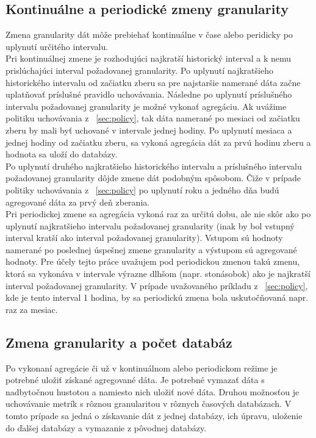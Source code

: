 \documentclass[12pt,twoside,color,cover,table]{fithesis3}
\begin{document}
\subsection{Kontinuálne a periodické zmeny granularity}
Zmena granularity dát môže prebiehať kontinuálne v čase alebo peridicky po uplynutí určitého intervalu. 
\\Pri kontinuálnej zmene je rozhodujúci najkratší historický interval a k nemu prislúchajúci interval požadovanej granularity. Po uplynutí najkratšieho historického intervalu od začiatku zberu sa pre 
najstaršie namerané dáta začne uplatňovať príslušné pravidlo uchovávania. Následne po uplynutí príslušného intervalu požadovanej granularity je možné vykonať agregáciu. 
Ak uvážime politiku uchovávania z ~\ref{sec:policy}, tak dáta namerané po mesiaci od začiatku zberu by mali byť uchované v intervale jednej hodiny. Po uplynutí mesiaca a jednej hodiny od začiatku zberu,
sa vykoná agregácia dát za prvú hodinu zberu a hodnota sa uloží do databázy.
\\Po uplynutí druhého najkratšieho historického intervalu a príslušného intervalu požadovanej granularity dôjde zmene dát podobným spôsobom. Čiže v prípade politiky uchovávania z ~\ref{sec:policy} po uplynutí
roku a jedného dňa budú agregované dáta za prvý deň zberania.
\\Pri periodickej zmene sa agregácia vykoná raz za určitú dobu, ale nie skôr ako po uplynutí najkratšieho intervalu požadovanej granularity
(inak by bol vstupný interval kratší ako interval požadovanej granularity). Vstupom sú hodnoty namerané po poslednej úspešnej zmene granularity a výstupom sú agregované hodnoty. Pre účely tejto práce
uvažujem pod periodickou zmenou takú zmenu, ktorá sa vykonáva v intervale výrazne dlhšom (napr. stonásobok) ako je najkratší interval požadovanej granularity. V prípade uvažovaného príkladu z ~\ref{sec:policy}, kde je 
tento interval 1 hodina, by sa periodickú zmena bola uskutočňovaná napr. raz za mesiac.


\subsection{Zmena granularity a počet databáz}
Po vykonaní agregácie či už v kontinuálnom alebo periodickom režime je potrebné uložiť získané agregované dáta. Je potrebné vymazať dáta s nadbytočnou hustotou a namiesto nich uložiť nové dáta.
Druhou možnosťou je uchovávanie metrík s rôznou granularitou v rôznych časových databázach. V tomto prípade sa jedná o získavanie dát z jednej databázy, ich úpravu, uloženie do ďalšej databázy a vymazanie 
z pôvodnej databázy.
\end{document}
